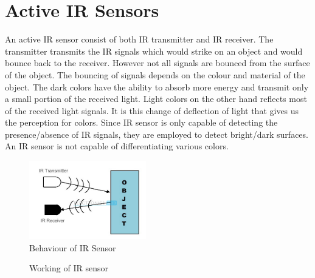\section{Active \ac{IR} Sensors}
\par An active \ac{IR} sensor consist of both \ac{IR} transmitter and \ac{IR} receiver. The transmitter transmits the \ac{IR} signals which would strike on an object and would bounce back to the receiver. However not all signals are bounced from the surface of the object. The bouncing of signals depends on the colour and material of the object. The dark colors have the ability to absorb more energy and transmit only a small portion of the received light. Light colors on the other hand reflects most of the received light signals. It is this change of deflection of light that gives us the perception for colors. Since \ac{IR} sensor is only capable of detecting the presence/absence of \ac{IR} signals, they are employed to detect bright/dark surfaces. An \ac{IR} sensor is not capable of differentiating various colors.

\begin{figure}
	\centering
	\includegraphics[width=2in]{Images/IR Sensor/IR_wave_bouncing.png}
	\caption{Behaviour of \ac{IR} Sensor}
\end{figure}

\begin{figure}
    \centering
    \qquad
    \caption[]{Working of IR sensor}
\end{figure}


